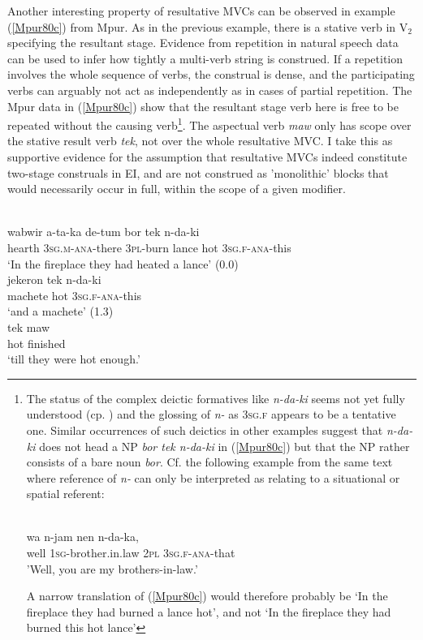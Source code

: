 Another interesting property of resultative MVCs can be observed in example (\ref{Mpur80c}) from Mpur. As in the previous example, there is a stative verb in V$_2$ specifying the resultant stage. Evidence from repetition in natural speech data can be used to infer how tightly a multi-verb string is construed. If a repetition involves the whole sequence of verbs, the construal is dense, and the participating verbs can arguably not act as independently as in cases of partial repetition. The Mpur data in (\ref{Mpur80c}) show that the resultant stage verb here is free to be repeated without the causing verb\footnote{The status of the complex deictic formatives like \textit{n-da-ki} seems not yet fully understood (cp. \citealt[64ff.]{ode2002sketch}) and the glossing of \textit{n-} as \textsc{3sg.f} appears to be a tentative one. Similar occurrences of such deictics in other examples suggest that \textit{n-da-ki} does not head a NP \textit{bor tek n-da-ki} in (\ref{Mpur80c}) but that the NP rather consists of a bare noun \textit{bor}. Cf. the following example from the same text where reference of \textit{n-} can only be interpreted as relating to a situational or spatial referent:

\ea \label{Mpur_p105}
\\
\gll wa n-jam nen n-da-ka, \\
well \textsc{1}\textsc{sg}-brother.in.law \textsc{2}\textsc{pl} \textsc{3}\textsc{sg}.\textsc{f}-\textsc{ana}-that \\
\glft 'Well, you are my brothers-in-law.'\\ 
\z

A narrow translation of (\ref{Mpur80c}) would therefore probably be `In the fireplace they had burned a lance hot', and not `In the fireplace they had burned this hot lance'}. The aspectual verb \textit{maw} only has scope over the stative result verb \textit{tek}, not over the whole resultative MVC. I take this as supportive evidence for the assumption that resultative MVCs indeed constitute two-stage construals in EI, and are not construed as 'monolithic' blocks that would necessarily occur in full, within the scope of a given modifier.

\ea \label{Mpur80c}
\\
\ea
\gll wabwir a-ta-ka de-tum bor tek n-da-ki \\
hearth \textsc{3}\textsc{sg}.\textsc{m}-\textsc{ana}-there \textsc{3}\textsc{pl}-burn lance hot \textsc{3}\textsc{sg}.\textsc{f}-\textsc{ana}-this \\
\glft `In the fireplace they had heated a lance' (0.0) \\ 
\ex
\gll jekeron tek n-da-ki\\ 
machete hot \textsc{3}\textsc{sg}.\textsc{f}-\textsc{ana}-this \\
\glft `and a machete' (1.3) \\ 
\ex
\gll tek maw \\ 
hot finished \\
\glft `till they were hot enough.'\\ 
\z
\z

